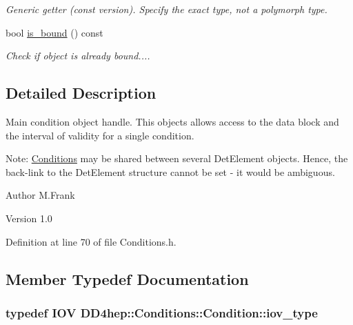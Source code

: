 \begin{DoxyCompactItemize}
\begin{DoxyCompactList}\small\item\em Generic getter (const version). Specify the exact type, not a polymorph type. \item\end{DoxyCompactList}\item 
bool \hyperlink{class_d_d4hep_1_1_conditions_1_1_condition_adddcbf402cb3e6fc31aebc933045da88}{is\_\-bound} () const 
\begin{DoxyCompactList}\small\item\em Check if object is already bound.... \item\end{DoxyCompactList}\end{DoxyCompactItemize}


\subsection{Detailed Description}
Main condition object handle. This objects allows access to the data block and the interval of validity for a single condition.

Note: \hyperlink{namespace_d_d4hep_1_1_conditions}{Conditions} may be shared between several DetElement objects. Hence, the back-\/link to the DetElement structure cannot be set -\/ it would be ambiguous.

\begin{DoxyAuthor}{Author}
M.Frank 
\end{DoxyAuthor}
\begin{DoxyVersion}{Version}
1.0 
\end{DoxyVersion}


Definition at line 70 of file Conditions.h.

\subsection{Member Typedef Documentation}
\hypertarget{class_d_d4hep_1_1_conditions_1_1_condition_ad84300e226b2085ec5e9db7f47be5539}{
\subsubsection[{iov\_\-type}]{\setlength{\rightskip}{0pt plus 5cm}typedef {\bf IOV} {\bf DD4hep::Conditions::Condition::iov\_\-type}}}
\label{class_d_d4hep_1_1_conditions_1_1_condition_ad84300e226b2085ec5e9db7f47be5539}



